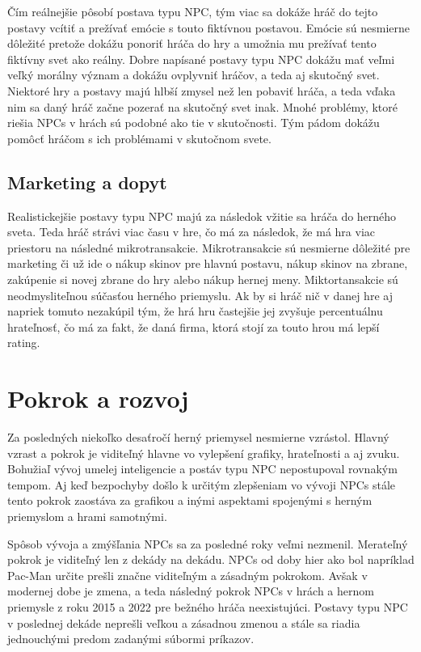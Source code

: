 \documentclass[10pt,twoside,slovak,a4paper]{article}
\begin{document}
Čím reálnejšie pôsobí postava typu NPC, tým viac sa dokáže hráč do tejto postavy vcítiť a prežívať emócie s touto fiktívnou postavou. Emócie sú nesmierne dôležité pretože dokážu ponoriť hráča do hry a umožnia mu prežívať tento fiktívny svet ako reálny. Dobre napísané postavy typu NPC dokážu mať veľmi veľký morálny význam a dokážu ovplyvniť hráčov, a teda aj skutočný svet. Niektoré hry a postavy majú hlbší zmysel než len pobaviť hráča, a teda vďaka nim sa daný hráč začne pozerať na skutočný svet inak. Mnohé problémy, ktoré riešia NPCs v hrách sú podobné ako tie v skutočnosti. Tým pádom dokážu pomôcť hráčom s ich problémami v skutočnom svete. 

\subsection{Marketing a dopyt}
Realistickejšie postavy typu NPC majú za následok vžitie sa hráča do herného sveta. Teda hráč strávi viac času v hre, čo má za následok, že má hra viac priestoru na následné mikrotransakcie. Mikrotransakcie sú nesmierne dôležité pre marketing či už ide o nákup skinov pre hlavnú postavu, nákup skinov na zbrane, zakúpenie si novej zbrane do hry alebo nákup hernej meny. Miktortansakcie sú neodmysliteľnou súčasťou herného priemyslu. 
Ak by si hráč nič v danej hre aj napriek tomuto nezakúpil tým, že hrá hru častejšie jej zvyšuje percentuálnu hrateľnosť, čo má za fakt, že daná firma, ktorá stojí za touto hrou má lepší rating.


\section{Pokrok a rozvoj}  \label{Rozvoj}

Za posledných niekoľko desaťročí herný priemysel nesmierne vzrástol. 
Hlavný vzrast a pokrok je viditeľný hlavne vo vylepšení grafiky, hrateľnosti a 
aj zvuku. Bohužiaľ vývoj umelej inteligencie a postáv typu NPC nepostupoval 
rovnakým tempom. \cite{phdthesis} Aj keď bezpochyby došlo k určitým zlepšeniam vo vývoji 
NPCs stále tento pokrok zaostáva za grafikou a inými aspektami spojenými s herným 
priemyslom a hrami samotnými. 

Spôsob vývoja a zmýšľania NPCs sa za posledné roky veľmi nezmenil. Merateľný pokrok je viditeľný len z dekády na dekádu. NPCs od doby hier ako bol napríklad Pac-Man určite prešli značne viditeľným a zásadným pokrokom. Avšak v modernej dobe je zmena, a teda následný pokrok NPCs v hrách a hernom priemysle z roku 2015 a 2022 pre bežného hráča neexistujúci. \cite{9730383} Postavy typu NPC v poslednej dekáde neprešli veľkou a zásadnou zmenou a stále sa riadia jednouchými predom zadanými súbormi príkazov.  
\end{document}
